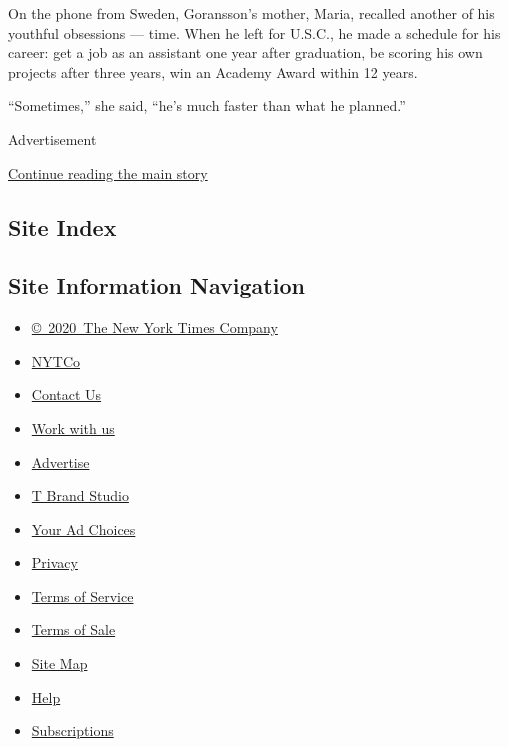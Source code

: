 On the phone from Sweden, Goransson's mother, Maria, recalled another of
his youthful obsessions --- time. When he left for U.S.C., he made a
schedule for his career: get a job as an assistant one year after
graduation, be scoring his own projects after three years, win an
Academy Award within 12 years.

``Sometimes,'' she said, ``he's much faster than what he planned.''

Advertisement

\protect\hyperlink{after-bottom}{Continue reading the main story}

\hypertarget{site-index}{%
\subsection{Site Index}\label{site-index}}

\hypertarget{site-information-navigation}{%
\subsection{Site Information
Navigation}\label{site-information-navigation}}

\begin{itemize}
\tightlist
\item
  \href{https://help.nytimes3xbfgragh.onion/hc/en-us/articles/115014792127-Copyright-notice}{©~2020~The
  New York Times Company}
\end{itemize}

\begin{itemize}
\tightlist
\item
  \href{https://www.nytco.com/}{NYTCo}
\item
  \href{https://help.nytimes3xbfgragh.onion/hc/en-us/articles/115015385887-Contact-Us}{Contact
  Us}
\item
  \href{https://www.nytco.com/careers/}{Work with us}
\item
  \href{https://nytmediakit.com/}{Advertise}
\item
  \href{http://www.tbrandstudio.com/}{T Brand Studio}
\item
  \href{https://www.nytimes3xbfgragh.onion/privacy/cookie-policy\#how-do-i-manage-trackers}{Your
  Ad Choices}
\item
  \href{https://www.nytimes3xbfgragh.onion/privacy}{Privacy}
\item
  \href{https://help.nytimes3xbfgragh.onion/hc/en-us/articles/115014893428-Terms-of-service}{Terms
  of Service}
\item
  \href{https://help.nytimes3xbfgragh.onion/hc/en-us/articles/115014893968-Terms-of-sale}{Terms
  of Sale}
\item
  \href{https://spiderbites.nytimes3xbfgragh.onion}{Site Map}
\item
  \href{https://help.nytimes3xbfgragh.onion/hc/en-us}{Help}
\item
  \href{https://www.nytimes3xbfgragh.onion/subscription?campaignId=37WXW}{Subscriptions}
\end{itemize}
